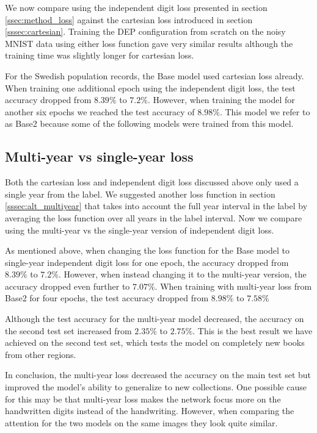 We now compare using the independent digit loss presented in section \ref{ssec:method_loss} against the cartesian loss introduced in section \ref{sssec:cartesian}.
Training the DEP configuration from scratch on the noisy MNIST data using either loss function gave very similar results although the training time was slightly longer for cartesian loss.

For the Swedish population records, the Base model used cartesian loss already. When training one additional epoch using the independent digit loss, the test accuracy dropped from $8.39\%$ to $7.2\%$. However, when training the model for another six epochs we reached the test accuracy of $8.98\%$. This model we refer to as  Base2 because some of the following models were trained from this model.

\subsection{Multi-year vs single-year loss} \label{ssec:result_multiyear}

Both the cartesian loss and independent digit loss discussed above only used a single year from the label. We suggested another loss function in section \ref{sssec:alt_multiyear} that takes into account the full year interval in the label by averaging the loss function over all years in the label interval. Now we compare using the multi-year vs the single-year version of independent digit loss.

As mentioned above, when changing the loss function for the Base model to single-year independent digit loss for one epoch, the accuracy dropped from $8.39\%$ to $7.2\%$. However, when instead changing it to the multi-year version, the accuracy dropped even further to $7.07\%$. When training with multi-year loss from  Base2 for four epochs, the test accuracy dropped from $8.98\%$ to $7.58\%$

Although the test accuracy for the multi-year model decreased, the accuracy on the second test set increased from $2.35\%$ to $2.75\%$. This is the best result we have achieved on the second test set, which tests the model on completely new books from other regions.

In conclusion, the multi-year loss decreased the accuracy on the main test set but improved the model's ability to generalize to new collections.
One possible cause for this may be that multi-year loss makes the network focus more on the handwritten digits instead of the handwriting. However, when comparing the attention for the two models on the same images they look quite similar.


